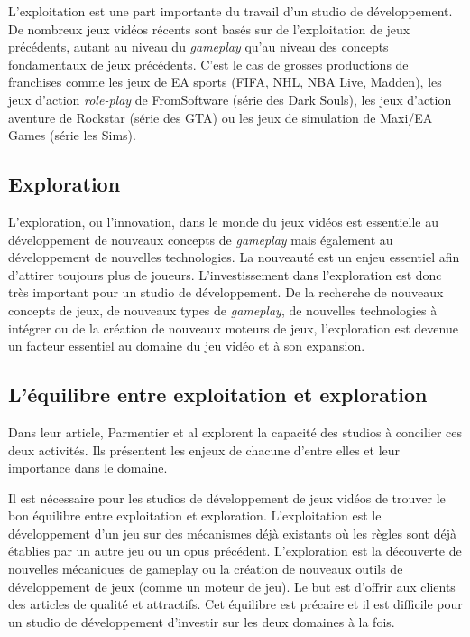 L'exploitation est une part importante du travail d'un studio de développement. De nombreux jeux vidéos récents sont basés sur de l'exploitation de jeux précédents, autant au niveau du \emph{gameplay} qu'au niveau des concepts fondamentaux de jeux précédents. C'est le cas de grosses productions de franchises comme les jeux de EA sports (FIFA, NHL, NBA Live, Madden), les jeux d'action \emph{role-play} de FromSoftware (série des Dark Souls), les jeux d'action aventure de Rockstar (série des GTA) ou les jeux de simulation de Maxi/EA Games (série les Sims). 

\subsection{Exploration}
L'exploration, ou l'innovation, dans le monde du jeux vidéos est essentielle au développement de nouveaux concepts de \emph{gameplay} mais également au développement de nouvelles technologies. La nouveauté est un enjeu essentiel afin d'attirer toujours plus de joueurs. L'investissement dans l'exploration est donc très important pour un studio de développement. De la recherche de nouveaux concepts de jeux, de nouveaux types de \emph{gameplay}, de nouvelles technologies à intégrer ou de la création de nouveaux moteurs de jeux, l'exploration est devenue un facteur essentiel au domaine du jeu vidéo et à son expansion.


\subsection{L'équilibre entre exploitation et exploration}
Dans leur article, Parmentier et al \cite{ParmentierGuy2009Iecd} explorent la capacité des studios à concilier ces deux activités. Ils présentent les enjeux de chacune d'entre elles et leur importance dans le domaine.

Il est nécessaire pour les studios de développement de jeux vidéos de trouver le bon équilibre entre exploitation et exploration. L'exploitation est le développement d'un jeu sur des mécanismes déjà existants où les règles sont déjà établies par un autre jeu ou un opus précédent. L'exploration est la découverte de nouvelles mécaniques de gameplay ou la création de nouveaux outils de développement de jeux (comme un moteur de jeu). Le but est d'offrir aux clients des articles de qualité et attractifs. Cet équilibre est précaire et il est difficile pour un studio de développement d'investir sur les deux domaines à la fois. 



